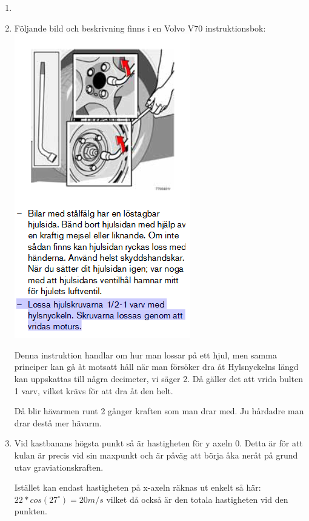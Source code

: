 \documentclass[a4paper,12pt]{article}
\begin{document}
\begin{enumerate}
      \item



      \item
            Följande bild och beskrivning finns i en Volvo V70 instruktionsbok:
            \includegraphics{Figur.png}

            Denna instruktion handlar om hur man lossar på ett hjul, men samma principer
            kan gå åt motsatt håll när man försöker dra åt
            Hylsnyckelns längd kan uppskattas till några decimeter, vi säger 2. Då gäller det att vrida
            bulten 1 varv, vilket krävs för att dra åt den helt.

            Då blir hävarmen runt 2 gånger kraften som man drar med. Ju hårdadre man drar destå
            mer hävarm.

      \item
            Vid kastbanans högsta punkt så är hastigheten för y axeln 0. Detta är för att
            kulan är precis vid sin maxpunkt och är påväg att börja åka neråt på grund utav
            graviationskraften.

            Istället kan endast hastigheten på x-axeln räknas ut enkelt så här:
            $22*cos(27^\circ)=20 m/s$ vilket då också är den totala hastigheten vid den punkten.


\end{enumerate}
\end{document}
